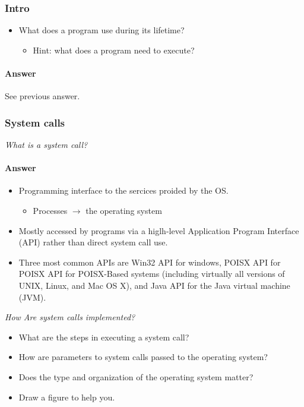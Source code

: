 
\subsubsection*{Intro}
\begin{itemize}
\item What does a program use during its lifetime?
  \begin{itemize}
  \item Hint: what does a program need to execute?
  \end{itemize}
\end{itemize}

\paragraph{Answer}
See previous answer.

\subsubsection*{System calls}

\emph{What is a system call?}
\paragraph{Answer}
\begin{itemize}
\item Programming interface to the sercices proided by the OS.
  \begin{itemize}
  \item Processes $\rightarrow$ the operating system
  \end{itemize}
\item Mostly accessed by programs via a higlh-level Application Program Interface (API) rather than direct system call use.
\item Three most common APIs are Win32 API for windows, POISX API for POISX API for POISX-Based systems (including virtually all versions of UNIX, Linux, and Mac OS X), and Java API for the Java virtual machine (JVM).
\end{itemize}

\emph{How Are system calls implemented?}
\begin{itemize}
\item What are the steps in executing a system call?
\item How are parameters to system calls passed to the operating system?
\item Does the type and organization of the operating system matter?
\item Draw a figure to help you.
\end{itemize}

